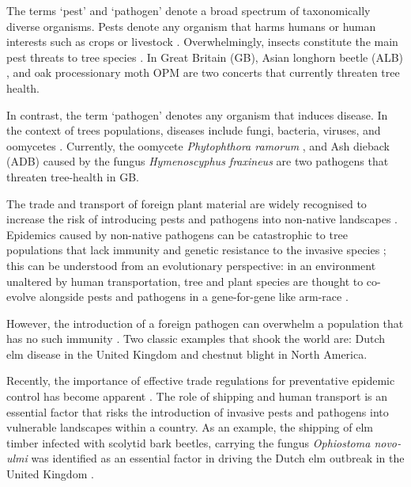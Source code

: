 
The terms `pest' and `pathogen' denote a broad spectrum of taxonomically diverse organisms. 
Pests denote any organism that harms humans or human interests such as crops or livestock
\cite{buckle2015rodent, oerke2006crop, de1964biological}. Overwhelmingly, insects constitute the main
pest threats to tree species \cite{metcalf1994introduction}. In Great Britain (GB), Asian longhorn beetle
(ALB) \cite{haack2010managing}, and oak processionary moth OPM \cite{tomlinson2015managing} are two concerts
that currently threaten tree health.

In contrast, the term `pathogen' denotes any organism that induces disease. 
In the context of trees populations, diseases include fungi, bacteria, viruses, and oomycetes \cite{balloux2017q, Boyd1235773}. 
Currently, the oomycete \textit{Phytophthora ramorum} \cite{brasier2005phytophthora}, and Ash dieback (ADB)
caused by the fungus \textit{Hymenoscyphus fraxineus} \cite{ash-dieback-costs, mitchell2014ash} are two pathogens
that threaten tree-health in GB.

The trade and transport of foreign plant material are widely recognised to increase the risk
of introducing pests and pathogens into non-native landscapes \cite{POTTER201761, lovett2016nonnative, roy2014increasing}.
Epidemics caused by non-native pathogens can be catastrophic to tree populations that lack immunity and genetic
resistance to the invasive species \cite{doi:10.1002/9781444329988.ch8}; this can be understood from an evolutionary perspective: 
in an environment unaltered by human transportation, tree and plant species are thought to co-evolve alongside pests and pathogens
in a gene-for-gene like arm-race \cite{flor1971current, dangl2001plant, Thrall1735}. 

However, the introduction of a foreign
pathogen can overwhelm a population that has no such immunity \cite{desprez2016evolutionary}. Two classic examples that shook
the world are: Dutch elm disease \cite{doi:10.1111/j.1365-3059.2010.02391.x} in the United Kingdom and chestnut blight
\cite{doi:10.1002/9780470535486.ch7} in North America.

Recently, the importance of effective trade regulations for preventative epidemic control has become apparent
\cite{rodoni2009role}. The role of shipping and human transport is an essential factor that risks the introduction
of invasive pests and pathogens into vulnerable landscapes within a country. As an example, the shipping of elm timber
infected with scolytid bark beetles, carrying the fungus \textit{Ophiostoma novo‐ulmi} was identified as an essential
factor in driving the Dutch elm outbreak in the United Kingdom \cite{doi:10.1111/j.1365-3059.2010.02391.x}. 

